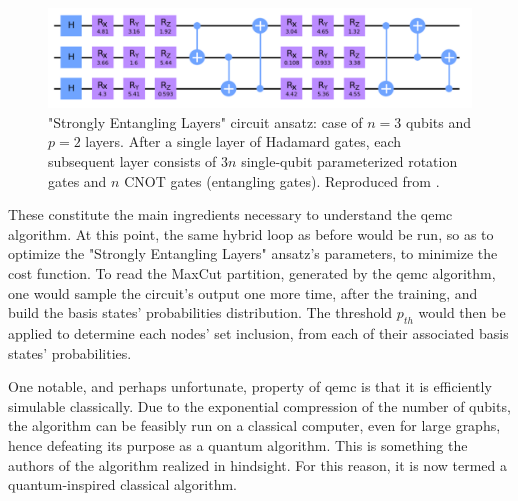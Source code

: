\begin{figure}[H]
    \centering
    \includegraphics[width = 0.85\linewidth]{Figures/Diagrams/Strongly_Entangling_Layers.png}
    \caption{"Strongly Entangling Layers" circuit ansatz: case of $n = 3$ qubits and $p = 2$ layers. After a single layer of Hadamard gates, each subsequent layer consists of $3n$ single-qubit parameterized rotation gates and $n$ CNOT gates (entangling gates). Reproduced from \cite{tenecohen2023variational}.}
    \label{fig:Strongly_Entangling_Layers}
\end{figure}

These constitute the main ingredients necessary to understand the \acrshort{qemc} algorithm. At this point, the same hybrid loop as before would be run, so as to optimize the "Strongly Entangling Layers" ansatz's parameters, to minimize the cost function. To read the MaxCut partition, generated by the \acrshort{qemc} algorithm, one would sample the circuit's output one more time, after the training, and build the basis states' probabilities distribution. The threshold $p_{th}$ would then be applied to determine each nodes' set inclusion, from each of their associated basis states' probabilities.

One notable, and perhaps unfortunate, property of \acrshort{qemc} is that it is efficiently simulable classically. Due to the exponential compression of the number of qubits, the algorithm can be feasibly run on a classical computer, even for large graphs, hence defeating its purpose as a quantum algorithm. This is something the authors of the algorithm \cite{tenecohen2023variational} realized in hindsight. For this reason, it is now termed a quantum-inspired classical algorithm.








